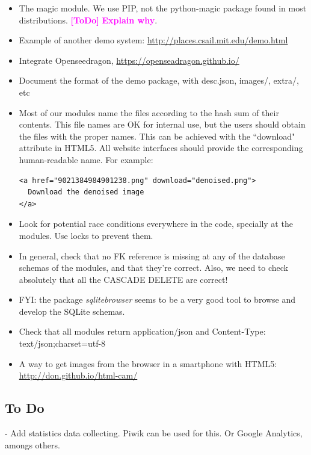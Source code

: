 \documentclass[a4paper,12pt]{article}
\newcommand{\ToDo}[1]{\textcolor{magenta}{\textbf{[ToDo]} \textbf{#1}}}
\begin{document}
\begin{itemize}
    \item The magic module. We use PIP, not the python-magic package found in most distributions. \ToDo{Explain why}.

    \item Example of another demo system: \url{http://places.csail.mit.edu/demo.html}

    \item Integrate Openseedragon, \url{https://openseadragon.github.io/}

    \item Document the format of the demo package, with desc.json, images/, extra/, etc

    \item Most of our modules name the files according to the hash sum of their contents. This file names are OK for internal use, but the users should obtain the files with the proper names. This can be achieved with the ``download" attribute in HTML5. All website interfaces should provide the corresponding human-readable name. For example:
        \begin{verbatim}
<a href="9021384984901238.png" download="denoised.png">
  Download the denoised image
</a>
        \end{verbatim}

    \item Look for potential race conditions everywhere in the code, specially at the modules. Use locks to prevent them.

    \item In general, check that no FK reference is missing at any of the database schemas of the modules, and that they're correct.
          Also, we need to check absolutely that all the CASCADE DELETE are correct!

    \item FYI: the package \emph{sqlitebrowser} seems to be a very good tool to browse and develop the SQLite schemas.

    \item Check that all modules return application/json and Content-Type: text/json;charset=utf-8

    \item A way to get images from the browser in a smartphone with HTML5: \url{http://don.github.io/html-cam/}
\end{itemize}



\subsection{To Do}
- Add statistics data collecting. Piwik can be used for this. Or Google Analytics, amongs others.




\end{document}
